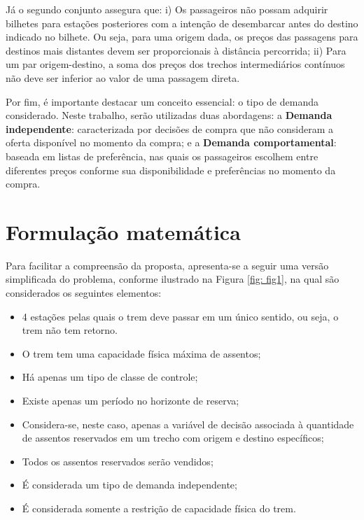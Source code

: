 Já o segundo conjunto assegura que: i) Os passageiros não possam adquirir bilhetes para estações posteriores com a intenção de desembarcar antes do destino indicado no bilhete. Ou seja, para uma origem dada, os preços das passagens para destinos mais distantes devem ser proporcionais à distância percorrida; ii) Para um par origem-destino, a soma dos preços dos trechos intermediários contínuos não deve ser inferior ao valor de uma passagem direta.

Por fim, é importante destacar um conceito essencial: o tipo de demanda considerado. Neste trabalho, serão utilizadas duas abordagens: a \textbf{Demanda independente}: caracterizada por decisões de compra que não consideram a oferta disponível no momento da compra; e a \textbf{Demanda comportamental}: baseada em listas de preferência, nas quais os passageiros escolhem entre diferentes preços conforme sua disponibilidade e preferências no momento da compra.


\section{Formulação matemática}


Para facilitar a compreensão da proposta, apresenta-se a seguir uma versão simplificada do problema, conforme ilustrado na Figura \ref{fig: fig1}, na qual são considerados os seguintes elementos:

\begin{itemize}
	\setlength{\itemsep}{-0.5em} %
	\item 4 estações pelas quais o trem deve passar em um único sentido, ou seja, o trem não tem retorno.
	\item O trem tem uma capacidade física máxima de assentos;
	\item Há apenas um tipo de classe de controle;
	\item Existe apenas um período no horizonte de reserva;
	\item Considera-se, neste caso, apenas a variável de decisão associada à quantidade de assentos reservados em um trecho com origem e destino específicos;
	\item Todos os assentos reservados serão vendidos;
	\item É considerada um tipo de demanda independente;
	\item É considerada somente a restrição de capacidade física do trem.
\end{itemize}

